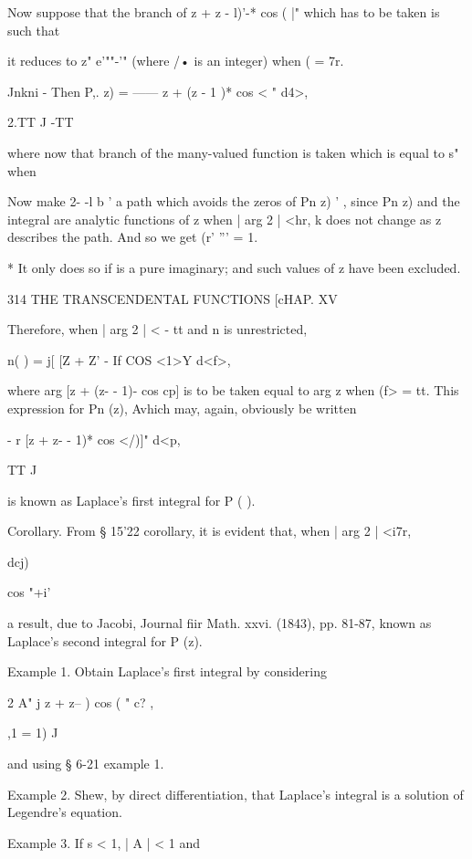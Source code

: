{{Now suppose that the branch of  z +  z - l)'-* cos ( |" which has to be taken is such that 

it reduces to z" e'""-'"  (where /• is an integer) when (  =  7r. 

Jnkni -  
Then P,.  z) = ——  z + (z  - 1 )* cos <  " d4>, 

2.TT J -TT 

where now that branch of the many-valued function is taken which is equal to s" when 

Now make 2- -l b ' a path which avoids the zeros of Pn z) ' , since Pn z) and the 
integral are analytic functions of z when | arg 2 | <hr, k does not change as z describes the 
path. And so we get (r' ''' = 1. 

* It only does so if   is a pure imaginary; and such values of z have been excluded. 



314 THE TRANSCENDENTAL FUNCTIONS [cHAP. XV 

Therefore, when | arg 2  | < - tt and n is unrestricted, 

 n( ) =  j[ [Z +  Z' - If COS <1>Y d<f>, 

where arg [z + (z- - 1)- cos cp] is to be taken equal to arg z when (f> =  tt. 
This expression for Pn (z), Avhich may, again, obviously be written 

- r [z +  z- - 1)* cos </)]" d<p, 

TT J 

is known as Laplace's first integral for P ( ). 

Corollary. From § 15'22 corollary, it is evident that, when | arg 2 | <i7r, 

dcj) 






 cos  "+i' 

a result, due to Jacobi, Journal fiir Math. xxvi. (1843), pp. 81-87, known as Laplace's 
second integral for P  (z). 

Example 1. Obtain Laplace's first integral by considering 

2 A" j  z +  z-- )   cos (  " c? , 

,1 = 1) J 

and using § 6-21 example 1. 

Example 2. Shew, by direct differentiation, that Laplace's integral is a solution of 
Legendre's equation. 

Example 3. If s < 1, | A | < 1 and 

}}
